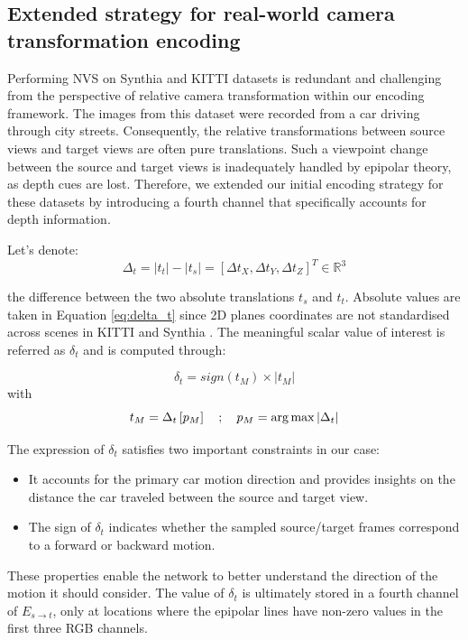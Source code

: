 \subsection{Extended strategy for real-world camera transformation encoding}

Performing \ac{NVS} on Synthia \citep{ros2016synthia} and KITTI \citep{geiger2012we} datasets is redundant and challenging from the perspective of relative camera transformation within our encoding framework. The images from this dataset were recorded from a car driving through city streets. Consequently, the relative transformations between source views and target views are often pure translations. Such a viewpoint change between the source and target views is inadequately handled by epipolar theory, as depth cues are lost. Therefore, we extended our initial encoding strategy for these datasets by introducing a fourth channel that specifically accounts for depth information.

Let's denote:
\begin{equation}
    \Delta_{t}= |t_{t}| - |t_{s}| = \left[\Delta t_{X},\Delta t_{Y},\Delta t_{Z} \right]^{T} \in \mathbb{R}^3
    \label{eq:delta_t}
\end{equation}

the difference between the two absolute translations $t_s$ and $t_t$. Absolute values are taken in Equation \eqref{eq:delta_t} since 2D planes coordinates are not standardised across scenes in KITTI \citep{geiger2012we} and Synthia \citep{ros2016synthia}. The meaningful scalar value of interest is referred as $\delta_{t}$ and is computed through:
 
 \begin{equation}
 \label{eq:2}
     \delta_{t} = sign(t_{M}) \times| t_{M} |
 \end{equation}
 with 
 \begin{equation}
    t_{M} = \Delta_{t}\left[p_{M}\right] \quad ; \quad p_{M}= \argmax|\Delta_{t}|
\end{equation}

The expression of $\delta_{t}$ satisfies two important constraints in our case: 

\begin{itemize}
    \item It accounts for the primary car motion direction and provides insights on the distance the car traveled between the source and target view.
    \item The sign of $\delta_{t}$ indicates whether the sampled source/target frames correspond to a forward or backward motion.  
\end{itemize}
These properties enable the network to better understand the direction of the motion it should consider. The value of  $\delta_{t}$ is ultimately stored in a fourth channel of $E_{s\xrightarrow{}t}$, only at locations where the epipolar lines have non-zero values in the first three RGB channels. 

